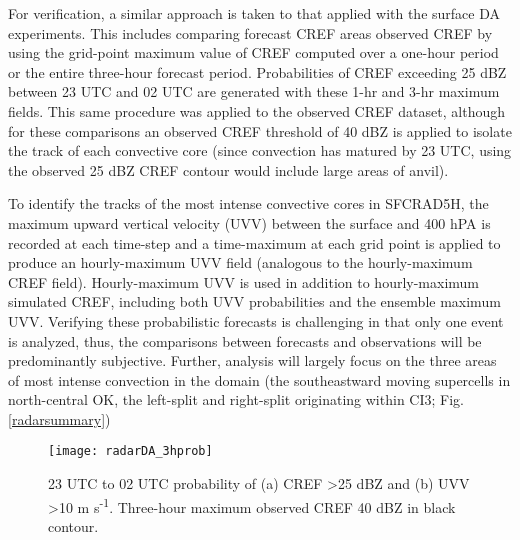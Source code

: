 For verification, a similar approach is taken to that applied with the surface DA experiments. This includes comparing forecast CREF areas observed CREF by using the grid-point maximum value of CREF computed over a one-hour period or the entire three-hour forecast period. Probabilities of CREF exceeding 25 dBZ between 23 UTC and 02 UTC are generated with these 1-hr and 3-hr maximum fields. This same procedure was applied to the observed CREF dataset, although for these comparisons an observed CREF threshold of 40 dBZ is applied to isolate the track of each convective core (since convection has matured by 23 UTC, using the observed 25 dBZ CREF contour would include large areas of anvil).

To identify the tracks of the most intense convective cores in SFCRAD5H, the maximum upward vertical velocity (UVV) between the surface and 400 hPA is recorded at each time-step and a time-maximum at each grid point is applied to produce an hourly-maximum UVV field (analogous to the hourly-maximum CREF field). Hourly-maximum UVV is used in addition to hourly-maximum simulated CREF, including both UVV probabilities and the ensemble maximum UVV. Verifying these probabilistic forecasts is challenging in that only one event is analyzed, thus, the comparisons between forecasts and observations will be predominantly subjective. Further, analysis will largely focus on the three areas of most intense convection in the domain (the southeastward moving supercells in north-central OK, the left-split and right-split originating within CI3; Fig. \ref{radarsummary})

\begin{figure}
\centering
\texttt{[image: radarDA\_3hprob]}
\OUsinglespace
\caption{23 UTC to 02 UTC probability of (a) CREF \textgreater 25 dBZ and (b) UVV \textgreater 10 m s\textsuperscript{-1}. Three-hour maximum observed CREF 40 dBZ in black contour.}
\label{3hrprob}
\end{figure}

